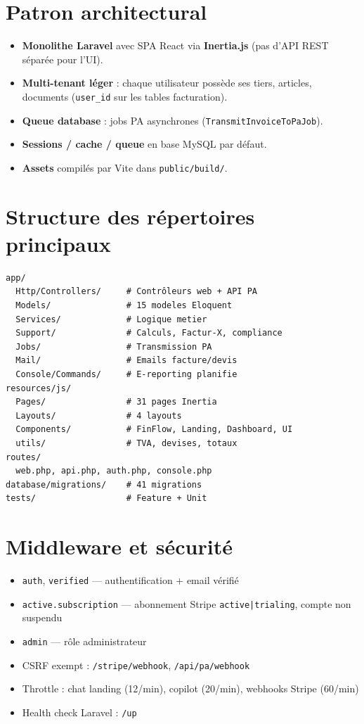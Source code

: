 \documentclass[11pt,a4paper]{report}
\newcommand{\filepath}[1]{\texttt{\small #1}}
\newcommand{\feat}[1]{\textbf{#1}}
\begin{document}
\section{Patron architectural}

\begin{itemize}[leftmargin=1.5em]
    \item \feat{Monolithe Laravel} avec SPA React via \textbf{Inertia.js} (pas d'API REST séparée pour l'UI).
    \item \feat{Multi-tenant léger} : chaque utilisateur possède ses tiers, articles, documents (\texttt{user\_id} sur les tables facturation).
    \item \feat{Queue database} : jobs PA asynchrones (\texttt{TransmitInvoiceToPaJob}).
    \item \feat{Sessions / cache / queue} en base MySQL par défaut.
    \item \feat{Assets} compilés par Vite dans \filepath{public/build/}.
\end{itemize}

\section{Structure des répertoires principaux}

\begin{lstlisting}
app/
  Http/Controllers/     # Contrôleurs web + API PA
  Models/               # 15 modeles Eloquent
  Services/             # Logique metier
  Support/              # Calculs, Factur-X, compliance
  Jobs/                 # Transmission PA
  Mail/                 # Emails facture/devis
  Console/Commands/     # E-reporting planifie
resources/js/
  Pages/                # 31 pages Inertia
  Layouts/              # 4 layouts
  Components/           # FinFlow, Landing, Dashboard, UI
  utils/                # TVA, devises, totaux
routes/
  web.php, api.php, auth.php, console.php
database/migrations/    # 41 migrations
tests/                  # Feature + Unit
\end{lstlisting}

\section{Middleware et sécurité}

\begin{itemize}[leftmargin=1.5em]
    \item \texttt{auth}, \texttt{verified} — authentification + email vérifié
    \item \texttt{active.subscription} — abonnement Stripe \texttt{active|trialing}, compte non suspendu
    \item \texttt{admin} — rôle administrateur
    \item CSRF exempt : \filepath{/stripe/webhook}, \filepath{/api/pa/webhook}
    \item Throttle : chat landing (12/min), copilot (20/min), webhooks Stripe (60/min)
    \item Health check Laravel : \filepath{/up}
\end{itemize}
\end{document}
